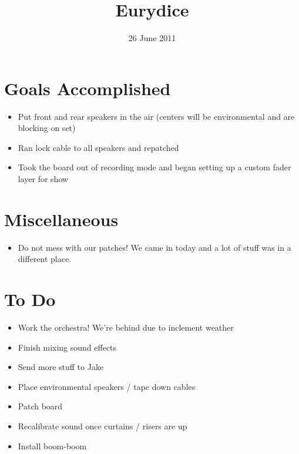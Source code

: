 \documentclass[11pt]{article}
\title{Eurydice}
\date{26 June 2011}
\begin{document}
\maketitle

\section*{Goals Accomplished}

\begin{itemize}
	\item Put front and rear speakers in the air (centers will be environmental and are blocking on set)
	\item Ran lock cable to all speakers and repatched
	\item Took the board out of recording mode and began setting up a custom fader layer for show
\end{itemize}

\section*{Miscellaneous}

\begin{itemize}
	\item Do not mess with our patches! We came in today and a lot of stuff was in a different place.
\end{itemize}

\section*{To Do}

\begin{itemize}
	\item Work the orchestra! We’re behind due to inclement weather
	\item Finish mixing sound effects
	\item Send more stuff to Jake
	\item Place environmental speakers / tape down cables
	\item Patch board
	\item Recalibrate sound once curtains / risers are up
	\item Install boom-boom
\end{itemize}

\attendance
\end{document}
